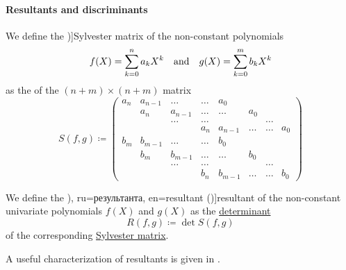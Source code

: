 \paragraph{Resultants and discriminants}

\begin{definition}\label{def:sylvester_matrix}
  We define the \term[ru=матрица Сильвестра, en=Sylvester's matrix (\cite[def. 3.6.2]{CoxLittleOShea2015IdealsVarietiesAlgorithms})]{Sylvester matrix} of the non-constant polynomials
  \begin{align*}
    f(X) = \sum_{k=0}^n a_k X^k
    &&\T{and}&&
    g(X) = \sum_{k=0}^m b_k X^k
  \end{align*}
  as the  of the \( (n + m) \times (n + m) \) matrix
  \begin{equation*}
    S(f, g) \coloneqq
    \begin{pmatrix}
      a_n    & a_{n-1} & \ldots  & \ldots  & a_0     &        &        &        \\
             & a_n     & a_{n-1} & \ldots  & \ldots  & a_0    &        &        \\
             &         & \ldots  & \ldots  &         &        & \ldots &        \\
             &         &         & a_n     & a_{n-1} & \ldots & \ldots & a_0    \\
      b_m    & b_{m-1} & \ldots  & \ldots  & b_0     &        &        &        \\
             & b_m     & b_{m-1} & \ldots  & \ldots  & b_0    &        &        \\
             &         & \ldots  & \ldots  &         &        & \ldots &        \\
             &         &         & b_n     & b_{m-1} & \ldots & \ldots & b_0
    \end{pmatrix}
  \end{equation*}
\end{definition}

\begin{definition}\label{def:resultant}
  We define the \term[bg=резултанта (\cite[198]{Обрешков1962ВисшаАлгебра}), ru=результанта, en=resultant (\cite[def. 3.6.2]{CoxLittleOShea2015IdealsVarietiesAlgorithms})]{resultant} of the non-constant univariate polynomials \( f(X) \) and \( g(X) \) as the \hyperref[def:matrix_determinant]{determinant}
  \begin{equation*}
    R(f, g) \coloneqq \det S(f, g)
  \end{equation*}
  of the corresponding \hyperref[def:sylvester_matrix]{Sylvester matrix}.
\end{definition}
\begin{comments}
  \item A useful characterization of resultants is given in .
\end{comments}

